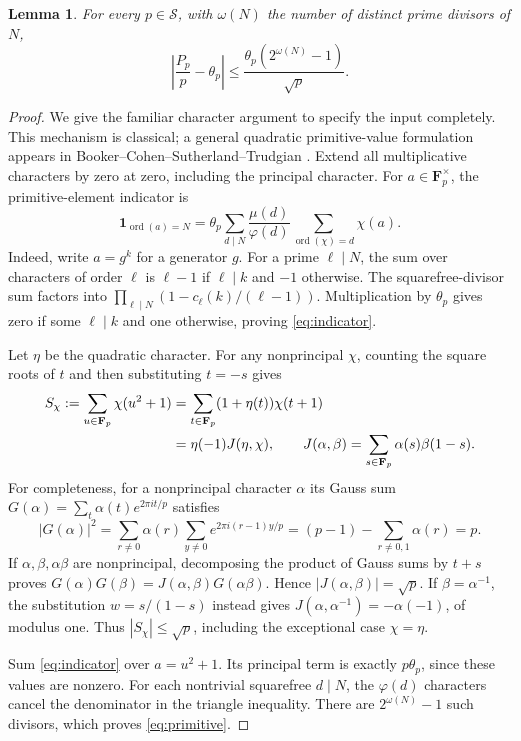 \documentclass[11pt]{article}
\newtheorem{lemma}[theorem]{Lemma}
\theoremstyle{remark}
\newcommand{\Fp}{\mathbf F_p}
\newcommand{\ord}{\operatorname{ord}}
\begin{document}
\begin{lemma}\label{lem:primitive}
For every $p\in\mathcal S$, with $\omega(N)$ the number of distinct
prime divisors of $N$,
\begin{equation}\label{eq:primitive}
 \left|\frac{P_p}{p}-\theta_p\right|
 \le\frac{\theta_p(2^{\omega(N)}-1)}{\sqrt p}.
\end{equation}
\end{lemma}
\begin{proof}
We give the familiar character argument to specify the input completely.
This mechanism is classical; a general quadratic primitive-value
formulation appears in Booker--Cohen--Sutherland--Trudgian
\cite[\S2, (5)--(6), Lemma 1]{BCST}.
Extend all multiplicative characters by zero at zero, including the
principal character. For $a\in\Fp^\times$, the primitive-element indicator is
\begin{equation}\label{eq:indicator}
 \boldsymbol1_{\ord(a)=N}
 =\theta_p\sum_{d\mid N}\frac{\mu(d)}{\varphi(d)}
             \sum_{\ord(\chi)=d}\chi(a).
\end{equation}
Indeed, write $a=g^k$ for a generator $g$. For a prime $\ell\mid N$,
the sum over characters of order $\ell$ is $\ell-1$ if $\ell\mid k$
and $-1$ otherwise. The squarefree-divisor sum factors into
$\prod_{\ell\mid N}(1-c_\ell(k)/(\ell-1))$. Multiplication by
$\theta_p$ gives zero if some $\ell\mid k$ and one otherwise, proving
\eqref{eq:indicator}.

Let $\eta$ be the quadratic character. For any nonprincipal $\chi$,
counting the square roots of $t$ and then substituting $t=-s$ gives
\begin{align}\label{eq:jacobi}
 S_\chi:=\sum_{u\in\Fp}\chi(u^2+1)
 &=\sum_{t\in\Fp}(1+\eta(t))\chi(t+1)\notag\\
 &=\eta(-1)J(\eta,\chi),\qquad
 J(\alpha,\beta)=\sum_{s\in\Fp}\alpha(s)\beta(1-s).
\end{align}
For completeness, for a nonprincipal character $\alpha$ its Gauss sum
$G(\alpha)=\sum_t\alpha(t)e^{2\pi i t/p}$ satisfies
\[
 |G(\alpha)|^2
 =\sum_{r\ne0}\alpha(r)\sum_{y\ne0}e^{2\pi i(r-1)y/p}
 =(p-1)-\sum_{r\ne0,1}\alpha(r)=p.
\]
If $\alpha,\beta,\alpha\beta$ are nonprincipal, decomposing the
product of Gauss sums by $t+s$ proves
$G(\alpha)G(\beta)=J(\alpha,\beta)G(\alpha\beta)$.
Hence $|J(\alpha,\beta)|=\sqrt p$. If $\beta=\alpha^{-1}$,
the substitution $w=s/(1-s)$ instead gives
$J(\alpha,\alpha^{-1})=-\alpha(-1)$, of modulus one.
Thus $|S_\chi|\le\sqrt p$, including the exceptional case $\chi=\eta$.

Sum \eqref{eq:indicator} over $a=u^2+1$. Its principal term is exactly
$p\theta_p$, since these values are nonzero. For each nontrivial
squarefree $d\mid N$, the $\varphi(d)$ characters cancel the denominator
in the triangle inequality. There are $2^{\omega(N)}-1$ such divisors,
which proves \eqref{eq:primitive}.
\end{proof}
\end{document}
